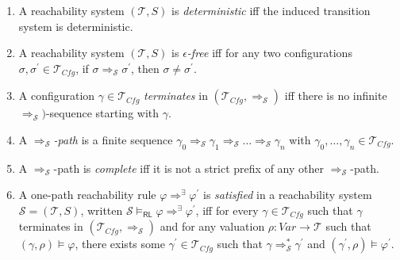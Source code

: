 \documentclass{article}
\newcommand{\RL}{\mathsf{RL}}
\newcommand{\Var}{\mathit{Var}}
\newcommand{\Tcfg}{\mathcal{T}_{\mathit{Cfg}}}
\begin{document}
\begin{definition}
\begin{enumerate}
    \item A reachability system $(\mathcal{T}, S)$ is \emph{deterministic} iff the induced transition system
          is deterministic.
          
    \item A reachability system $(\mathcal{T}, S)$ is \emph{$\epsilon$-free}
          iff for any two configurations $\sigma, \sigma^\prime \in \mathcal{T}_{\mathit{Cfg}}$, if
          $\sigma \Rightarrow_{\mathcal{S}} \sigma^\prime$, then $\sigma \not = \sigma^\prime$.

    \item A configuration $\gamma \in \Tcfg$ \emph{terminates} in $(\Tcfg , \Rightarrow_{\mathcal{S}})$
          iff there is no infinite $\Rightarrow_{\mathcal{S}})$-sequence starting with $\gamma$.
          
    \item A \emph{$\Rightarrow_{\mathcal{S}}$-path} is a finite
          sequence $\gamma_0 \Rightarrow_{\mathcal{S}} \gamma_1 \Rightarrow_{\mathcal{S}} \ldots
          \Rightarrow_{\mathcal{S}} \gamma_n$
          with $\gamma_0,\ldots,\gamma_n \in \Tcfg$.
          
    \item A $\Rightarrow_{\mathcal{S}}$-path is \emph{complete}
          iff it is not a strict prefix of any
          other $\Rightarrow_{\mathcal{S}}$-path.

    \item \label{def:oprlSemantics}
          A one-path reachability rule $\varphi \Rightarrow^\exists \varphi^\prime$ is \emph{satisfied}
          in a reachability system $\mathcal{S} = (\mathcal{T}, S)$,
          written $\mathcal{S} \vDash_\RL \varphi \Rightarrow^\exists \varphi^\prime$,
          iff for every $\gamma \in \Tcfg$
          such that $\gamma$ terminates in $(\Tcfg, \Rightarrow_{\mathcal{S}})$
          and for any valuation $\rho : \Var \to \mathcal{T}$
          such that $(\gamma, \rho) \vDash \varphi$,
          there exists some $\gamma^\prime \in \Tcfg$
          such that
          $\gamma \Rightarrow^{*}_{\mathcal{S}} \gamma^\prime$
          and $(\gamma^\prime, \rho) \vDash \varphi^\prime$.
          
          
%    
\end{enumerate}


\end{definition}
\end{document}

